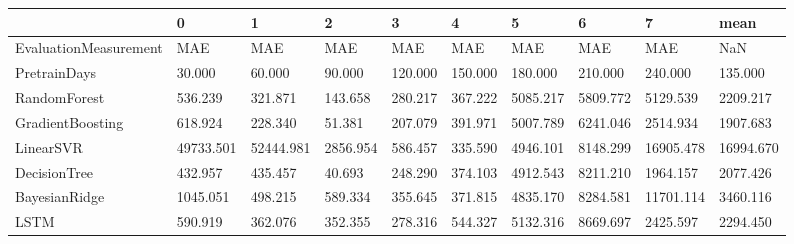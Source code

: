 \begin{tabular}{llllllllll}
\toprule
{} &         0 &         1 &        2 &       3 &       4 &        5 &        6 &         7 &      mean \\
\midrule
EvaluationMeasurement &       MAE &       MAE &      MAE &     MAE &     MAE &      MAE &      MAE &       MAE &       NaN \\
PretrainDays          &    30.000 &    60.000 &   90.000 & 120.000 & 150.000 &  180.000 &  210.000 &   240.000 &   135.000 \\
RandomForest          &   536.239 &   321.871 &  143.658 & 280.217 & 367.222 & 5085.217 & 5809.772 &  5129.539 &  2209.217 \\
GradientBoosting      &   618.924 &   228.340 &   51.381 & 207.079 & 391.971 & 5007.789 & 6241.046 &  2514.934 &  1907.683 \\
LinearSVR             & 49733.501 & 52444.981 & 2856.954 & 586.457 & 335.590 & 4946.101 & 8148.299 & 16905.478 & 16994.670 \\
DecisionTree          &   432.957 &   435.457 &   40.693 & 248.290 & 374.103 & 4912.543 & 8211.210 &  1964.157 &  2077.426 \\
BayesianRidge         &  1045.051 &   498.215 &  589.334 & 355.645 & 371.815 & 4835.170 & 8284.581 & 11701.114 &  3460.116 \\
LSTM                  &   590.919 &   362.076 &  352.355 & 278.316 & 544.327 & 5132.316 & 8669.697 &  2425.597 &  2294.450 \\
\bottomrule
\end{tabular}
